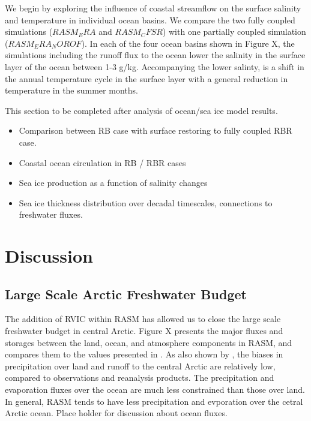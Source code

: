 \documentclass[ms, draft]{agutex}
\begin{document}
\begin{article}
We begin by exploring the influence of coastal streamflow on the surface salinity and temperature in individual ocean basins.
We compare the two fully coupled simulations ($RASM_ERA$ and $RASM_CFSR$) with one partially coupled simulation ($RASM_ERA_NOROF$).
In each of the four ocean basins shown in Figure X, the simulations including the runoff flux to the ocean lower the salinity in the surface layer of the ocean between 1-3 g/kg.
Accompanying the lower salinty, is a shift in the annual temperature cycle in the surface layer with a general reduction in temperature in the summer months.

This section to be completed after analysis of ocean/sea ice model results.
\begin{itemize}
\item Comparison between RB case with surface restoring to fully coupled RBR case.
\item Coastal ocean circulation in RB / RBR cases
\item Sea ice production as a function of salinity changes
\item Sea ice thickness distribution over decadal timescales, connections to freshwater fluxes.
\end{itemize}

\section{Discussion}

\subsection{Large Scale Arctic Freshwater Budget}
The addition of RVIC within RASM has allowed us to close the large scale freshwater budget in central Arctic.
Figure X presents the major fluxes and storages between the land, ocean, and atmosphere components in RASM, and compares them to the values presented in \citet{Serreze_2006}.
As also shown by \citet{Hamman_2015}, the biases in precipitation over land and runoff to the central Arctic are relatively low, compared to observations and reanalysis products.
The precipitation and evaporation fluxes over the ocean are much less constrained than those over land.
In general, RASM tends to have less precipitation and evporation over the cetral Arctic ocean.
Place holder for discussion about ocean fluxes.


\end{article}
\end{document}
